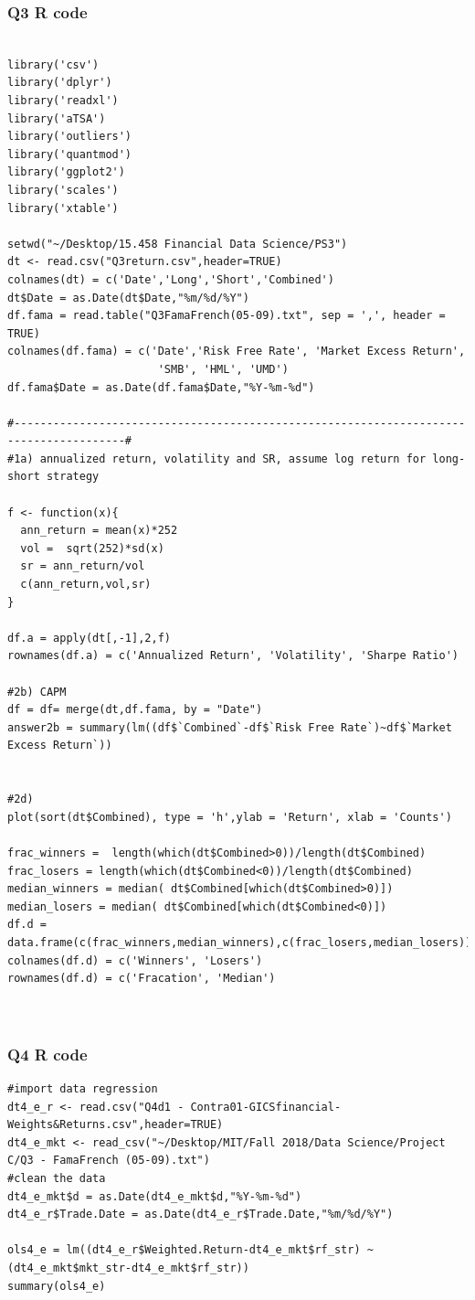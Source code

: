 \documentclass[10pt]{article}
\begin{document}
\subsubsection*{Q3 R code}
\begin{lstlisting}

library('csv')
library('dplyr')
library('readxl')
library('aTSA')
library('outliers')
library('quantmod')
library('ggplot2')
library('scales')
library('xtable')

setwd("~/Desktop/15.458 Financial Data Science/PS3")
dt <- read.csv("Q3return.csv",header=TRUE)
colnames(dt) = c('Date','Long','Short','Combined')
dt$Date = as.Date(dt$Date,"%m/%d/%Y")
df.fama = read.table("Q3FamaFrench(05-09).txt", sep = ',', header = TRUE)
colnames(df.fama) = c('Date','Risk Free Rate', 'Market Excess Return',
                       'SMB', 'HML', 'UMD')
df.fama$Date = as.Date(df.fama$Date,"%Y-%m-%d")

#---------------------------------------------------------------------------------------#
#1a) annualized return, volatility and SR, assume log return for long-short strategy
 
f <- function(x){
  ann_return = mean(x)*252
  vol =  sqrt(252)*sd(x)
  sr = ann_return/vol
  c(ann_return,vol,sr)
}

df.a = apply(dt[,-1],2,f)
rownames(df.a) = c('Annualized Return', 'Volatility', 'Sharpe Ratio')

#2b) CAPM
df = df= merge(dt,df.fama, by = "Date")
answer2b = summary(lm((df$`Combined`-df$`Risk Free Rate`)~df$`Market Excess Return`))


#2d)
plot(sort(dt$Combined), type = 'h',ylab = 'Return', xlab = 'Counts')

frac_winners =  length(which(dt$Combined>0))/length(dt$Combined)
frac_losers = length(which(dt$Combined<0))/length(dt$Combined)
median_winners = median( dt$Combined[which(dt$Combined>0)])
median_losers = median( dt$Combined[which(dt$Combined<0)])
df.d = data.frame(c(frac_winners,median_winners),c(frac_losers,median_losers))
colnames(df.d) = c('Winners', 'Losers')
rownames(df.d) = c('Fracation', 'Median')



\end{lstlisting}


\subsubsection*{Q4 R code}
\begin{lstlisting}
#import data regression
dt4_e_r <- read.csv("Q4d1 - Contra01-GICSfinancial-Weights&Returns.csv",header=TRUE)
dt4_e_mkt <- read_csv("~/Desktop/MIT/Fall 2018/Data Science/Project C/Q3 - FamaFrench (05-09).txt")
#clean the data
dt4_e_mkt$d = as.Date(dt4_e_mkt$d,"%Y-%m-%d")
dt4_e_r$Trade.Date = as.Date(dt4_e_r$Trade.Date,"%m/%d/%Y")

ols4_e = lm((dt4_e_r$Weighted.Return-dt4_e_mkt$rf_str) ~ (dt4_e_mkt$mkt_str-dt4_e_mkt$rf_str))
summary(ols4_e)


\end{lstlisting}
\end{document}
